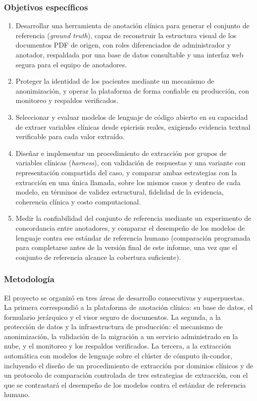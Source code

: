 \documentclass[12pt,letterpaper]{article}
\begin{document}
\subsubsection{Objetivos específicos}

\begin{enumerate}
    \item Desarrollar una herramienta de anotación clínica para generar el conjunto de referencia (\textit{ground truth}), capaz de reconstruir la estructura visual de los documentos PDF de origen, con roles diferenciados de administrador y anotador, respaldada por una base de datos consultable y una interfaz web segura para el equipo de anotadores.
    \item Proteger la identidad de los pacientes mediante un mecanismo de anonimización, y operar la plataforma de forma confiable en producción, con monitoreo y respaldos verificados.
    \item Seleccionar y evaluar modelos de lenguaje de código abierto en su capacidad de extraer variables clínicas desde epicrisis reales, exigiendo evidencia textual verificable para cada valor extraído.
    \item Diseñar e implementar un procedimiento de extracción por grupos de variables clínicas (\textit{harness}), con validación de respuestas y una variante con representación compartida del caso, y comparar ambas estrategias con la extracción en una única llamada, sobre los mismos casos y dentro de cada modelo, en términos de validez estructural, fidelidad de la evidencia, coherencia clínica y costo computacional.
    \item Medir la confiabilidad del conjunto de referencia mediante un experimento de concordancia entre anotadores, y comparar el desempeño de los modelos de lenguaje contra ese estándar de referencia humano (comparación programada para completarse antes de la versión final de este informe, una vez que el conjunto de referencia alcance la cobertura suficiente).
\end{enumerate}

\subsubsection{Metodología}

El proyecto se organizó en tres áreas de desarrollo consecutivas y superpuestas. La primera correspondió a la plataforma de anotación clínica: su base de datos, el formulario jerárquico y el visor seguro de documentos. La segunda, a la protección de datos y la infraestructura de producción: el mecanismo de anonimización, la validación de la migración a un servicio administrado en la nube, y el monitoreo y los respaldos verificados. La tercera, a la extracción automática con modelos de lenguaje sobre el clúster de cómputo ih-condor, incluyendo el diseño de un procedimiento de extracción por dominios clínicos y de un protocolo de comparación controlada de tres estrategias de extracción, con el que se contrastará el desempeño de los modelos contra el estándar de referencia humano.
\end{document}
